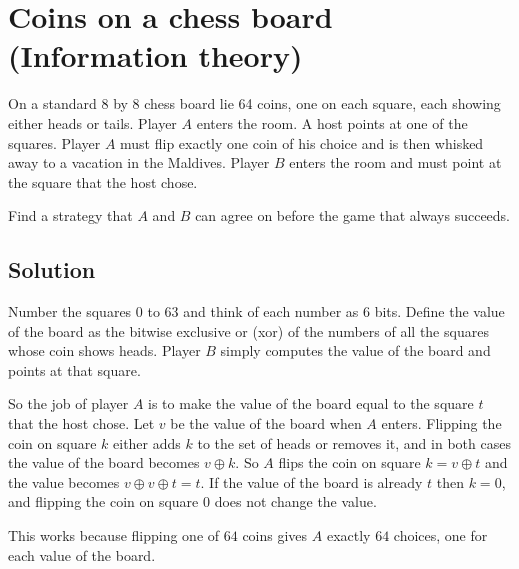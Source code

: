 \section {Coins on a chess board (Information theory)}

On a standard 8 by 8 chess board lie 64 coins, one on each square, each showing either heads or tails.
Player $A$ enters the room. A host points at one of the squares.
Player $A$ must flip exactly one coin of his choice and is then whisked away to a vacation in the Maldives.
Player $B$ enters the room and must point at the square that the host chose.

Find a strategy that $A$ and $B$ can agree on before the game that always succeeds.

\subsection{Solution}

Number the squares $0$ to $63$ and think of each number as $6$ bits.
Define the value of the board as the bitwise exclusive or (xor) of the numbers of all the squares whose coin shows heads.
Player $B$ simply computes the value of the board and points at that square.

So the job of player $A$ is to make the value of the board equal to the square $t$ that the host chose.
Let $v$ be the value of the board when $A$ enters.
Flipping the coin on square $k$ either adds $k$ to the set of heads or removes it, and in both cases the value of the board becomes $v \oplus k$.
So $A$ flips the coin on square $k = v \oplus t$ and the value becomes $v \oplus v \oplus t = t$.
If the value of the board is already $t$ then $k=0$, and flipping the coin on square $0$ does not change the value.

This works because flipping one of $64$ coins gives $A$ exactly $64$ choices, one for each value of the board.
